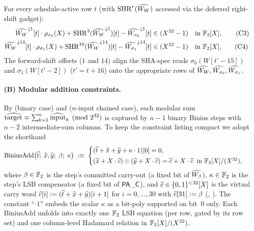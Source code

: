 For every schedule-active row $t$ (with $\operatorname{SHR}^r(\widehat{W_W})$ accessed
via the deferred right-shift gadget):
\begin{align}
\widehat{W_W}^{\downarrow 1}[t] \cdot \rho_{\sigma_0}(X) + \operatorname{SHR}^{3}(\widehat{W_W}^{\downarrow 1})[t] - \widehat{W_{\sigma_0}}^{\downarrow 1}[t] &\in (X^{32}-1) \quad \text{in } \mathbb{F}_2[X], \tag{C3}\label{con:rot-lsig0}\\
\widehat{W_W}^{\downarrow 14}[t] \cdot \rho_{\sigma_1}(X) + \operatorname{SHR}^{10}(\widehat{W_W}^{\downarrow 14})[t] - \widehat{W_{\sigma_1}}^{\downarrow 14}[t] &\in (X^{32}-1) \quad \text{in } \mathbb{F}_2[X]. \tag{C4}\label{con:rot-lsig1}
\end{align}
The forward-shift offsets ($1$ and $14$) align the SHA-spec reads
$\sigma_0(W[t'-15])$ and $\sigma_1(W[t'-2])$ ($t' = t + 16$) onto the
appropriate rows of $\widehat{W_W}, \widehat{W_{\sigma_0}}, \widehat{W_{\sigma_1}}$.


\paragraph{(B) Modular addition constraints.}

By  (binary case) and 
($n$-input chained case), each modular sum
$\widehat{\mathrm{target}} \equiv \sum_{k=1}^{n} \widehat{\mathrm{input}}_k
\pmod{2^{32}}$ is captured by $n - 1$ binary Binius steps with
$n - 2$ intermediate-sum columns. To keep the constraint listing
compact we adopt the shorthand
\begin{equation}\label{eq:binius-add-template}
\mathrm{BiniusAdd}\bigl(\widehat{t};\; \widehat{x}, \widehat{y};\; \beta;\; \kappa\bigr)
\;:\equiv\;
\begin{cases}
(\widehat{t} + \widehat{x} + \widehat{y} + \kappa \cdot 1)[0] = 0, \\[2pt]
(\widehat{x} + X\cdot\widehat{c}) \odot (\widehat{y} + X\cdot\widehat{c}) = \widehat{c} + X\cdot\widehat{c}
\;\;\text{in } \mathbb{F}_2[X]/(X^{32}),
\end{cases}
\end{equation}
where $\beta \in \mathbb{F}_2$ is the step's committed carry-out (a fixed bit
of $\widehat{W_\beta}$), $\kappa \in \mathbb{F}_2$ is the step's LSB compensator (a
fixed bit of $\mathsf{PA\_C}$), and $\widehat{c} \in \{0,1\}^{<32}[X]$ is the
virtual carry word $\widehat{c}[i] := (\widehat{t} + \widehat{x} + \widehat{y})[i+1]$ for
$i = 0, \dots, 30$ with $\widehat{c}[31] := \beta$ (,
). The constant ``$\cdot 1$'' embeds the scalar
$\kappa$ as a bit-poly supported on bit~$0$ only. Each
$\mathrm{BiniusAdd}$ unfolds into exactly one $\mathbb{F}_2$ LSB equation
(per row, gated by its row set) and one column-level Hadamard
relation in $\mathbb{F}_2[X]/(X^{32})$.


